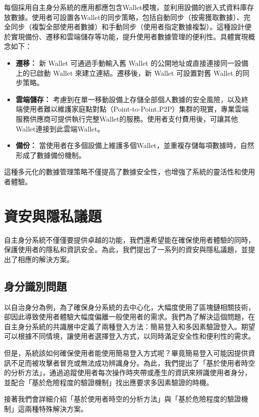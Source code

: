 每個採用自主身分系統的應用都應包含Wallet模塊，並利用設備的嵌入式資料庫存放數據。使用者可設置各Wallet的同步策略，包括自動同步（按需獲取數據）、完全同步（複製全部使用者數據）和手動同步（使用者指定數據複製）。這種設計便於實現備份、遷移和雲端儲存等功能，提升使用者數據管理的便利性。具體實現概念如下：
\begin{itemize}
  \item \textbf{遷移：} 新 Wallet 可通過手動輸入舊 Wallet 的公開地址或直接連接同一設備上的已啟動 Wallet 來建立連結。遷移後，新 Wallet 可設置對舊 Wallet 的同步策略。
  \item \textbf{雲端儲存：} 考慮到在單一移動設備上存儲全部個人數據的安全風險，以及終端使用者難以維護家庭點對點（Point-to-Point,P2P）集群的現實，專業雲端服務供應商可提供執行完整Wallet的服務。使用者支付費用後，可讓其他 Wallet連接到此雲端Wallet。
  \item \textbf{備份：} 當使用者在多個設備上維護多個Wallet，並重複存儲每項數據時，自然形成了數據備份機制。
\end{itemize}
這種多元化的數據管理策略不僅提高了數據安全性，也增強了系統的靈活性和使用者體驗。
\section{資安與隱私議題}
自主身分系統不僅僅要提供卓越的功能，我們還希望能在確保使用者體驗的同時，保護使用者的隱私和資訊安全。為此，我們提出了一系列的資安與隱私議題，並提出了相應的解決方案。
\subsection{身分識別問題}
以自治身分為例，為了確保身分系統的去中心化，大幅度使用了區塊鏈相關技術，卻因此導致使用者體驗大幅度偏離一般使用者的需求。我們為了解決這個問題，在自主身分系統的共識層中定義了兩種登入方法：簡易登入和多因素驗證登入。期望可以根據不同情境，讓使用者選擇登入方式，以同時滿足安全性和便利性的需求。

但是，系統該如何確保使用者能使用簡易登入方式呢？畢竟簡易登入可能因提供資訊不足而被攻擊者冒充或無法成功辨識身分。為此，我們提出了「基於使用者時空的分析方法」，通過追蹤使用者每次操作時夾帶或產生的資訊來辨識使用者身分，並配合「基於危險程度的驗證機制」找出應要求多因素驗證的時機。

接著我們會詳細介紹「基於使用者時空的分析方法」與「基於危險程度的驗證機制」這兩種特殊解決方案。
